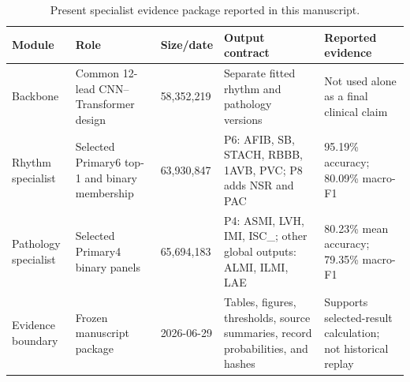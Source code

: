 \documentclass[life,article,submit,moreauthors]{Definitions/mdpi}
\begin{document}
\begin{table}[htbp]
\caption{Present specialist evidence package reported in this manuscript.\label{tab:presentstudy}}
\centering
\small
\begin{tabular}{@{}p{.12\linewidth}p{.19\linewidth}p{.14\linewidth}p{.28\linewidth}p{.17\linewidth}@{}}
\toprule
\textbf{Module} & \textbf{Role} & \textbf{Size/date} & \textbf{Output contract} & \textbf{Reported evidence} \\
\midrule
Backbone & Common 12-lead CNN--Transformer design & 58,352,219 & Separate fitted rhythm and pathology versions & Not used alone as a final clinical claim \\
Rhythm specialist & Selected Primary6 top-1 and binary membership & 63,930,847 & P6: AFIB, SB, STACH, RBBB, 1AVB, PVC; P8 adds NSR and PAC & 95.19\% accuracy; 80.09\% macro-F1 \\
Pathology specialist & Selected Primary4 binary panels & 65,694,183 & P4: ASMI, LVH, IMI, ISC\_; other global outputs: ALMI, ILMI, LAE & 80.23\% mean accuracy; 79.35\% macro-F1 \\
Evidence boundary & Frozen manuscript package & 2026-06-29 & Tables, figures, thresholds, source summaries, record probabilities, and hashes & Supports selected-result calculation; not historical replay \\
\bottomrule
\end{tabular}
\end{table}
\end{document}
